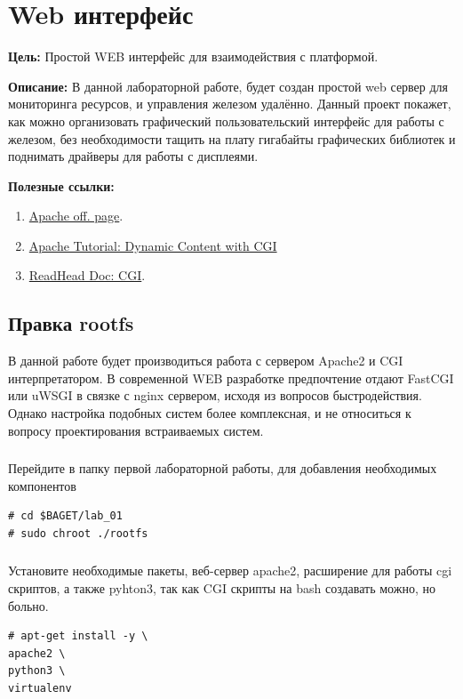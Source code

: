 \chapter{Web интерфейс}
\textbf{Цель:} Простой WEB интерфейс для взаимодействия с платформой.

\vspace{5mm}
\textbf{Описание:} В данной лабораторной работе, будет создан простой web сервер для мониторинга ресурсов, и управления железом удалённо. Данный проект покажет, как можно организовать графический пользовательский интерфейс для работы с железом, без необходимости тащить на плату гигабайты графических библиотек и поднимать драйверы для работы с дисплеями.  

\vspace{5mm}
\textbf{Полезные ссылки:}
\begin{enumerate}
	\item \href{https://httpd.apache.org/}{Apache off. page}.
	\item \href{https://httpd.apache.org/docs/2.4/howto/cgi.html}{Apache Tutorial: Dynamic Content with CGI}
	\item \href{https://lectureswww.readthedocs.io/5.web.server/cgi.html}{ReadHead Doc: CGI}.

\end{enumerate}

\section{Правка rootfs}

В данной работе будет производиться работа с сервером Apache2 и CGI интерпретатором. В современной WEB разработке предпочтение отдают FastCGI или uWSGI в связке с nginx сервером, исходя из вопросов быстродействия. Однако настройка подобных систем более комплексная, и не относиться к вопросу проектирования встраиваемых систем. 

\subsection{} Перейдите в папку первой лабораторной работы, для добавления необходимых компонентов
\begin{lstlisting}[style=bash]
# cd $BAGET/lab_01
# sudo chroot ./rootfs
\end{lstlisting}


\subsection{} Установите необходимые пакеты, веб-сервер apache2, расширение для работы cgi скриптов, а также pyhton3, так как CGI скрипты на bash создавать можно, но больно.
\begin{lstlisting}[style=bash]
# apt-get install -y \
apache2 \
python3 \
virtualenv
\end{lstlisting}


